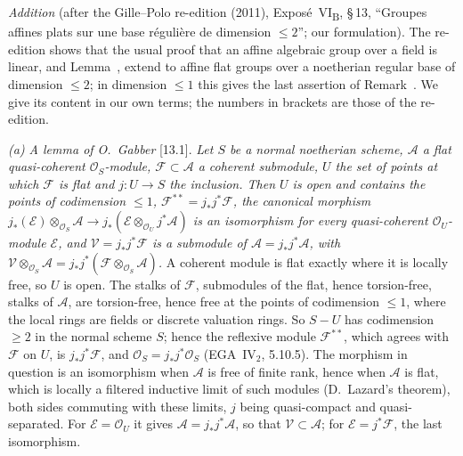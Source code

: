 
\par\bigskip\noindent{}\label{sec:sga3-VIB-13}%
\emph{Addition} (after the Gille--Polo re-edition (2011), Expos\'e~VI\textsubscript{B},
\S\,13, ``Groupes affines plats sur une base r\'eguli\`ere de dimension \(\leq2\)''; our
formulation). The re-edition shows that the usual proof that an affine algebraic group over a
field is linear, and Lemma~, extend to affine flat groups
over a noetherian regular base of dimension \(\leq2\); in dimension \(\leq1\) this gives the
last assertion of Remark~. We give its content in our
own terms; the numbers in brackets are those of the re-edition.

\par\smallskip\noindent\textit{(a) A lemma of O.~Gabber} [13.1]. \emph{Let \(S\) be a normal
noetherian scheme, \(\mathcal A\) a flat quasi-coherent \(\mathcal O_S\)-module,
\(\mathcal F\subset\mathcal A\) a coherent submodule, \(U\) the set of points at which
\(\mathcal F\) is flat and \(j:U\to S\) the inclusion. Then \(U\) is open and contains the
points of codimension \(\leq1\), \(\mathcal F^{**}=j_*j^*\mathcal F\), the canonical morphism
\(j_*(\mathcal E)\otimes_{\mathcal O_S}\mathcal A\to
j_*(\mathcal E\otimes_{\mathcal O_U}j^*\mathcal A)\) is an isomorphism for every
quasi-coherent \(\mathcal O_U\)-module \(\mathcal E\), and \(\mathcal V=j_*j^*\mathcal F\) is a
submodule of \(\mathcal A=j_*j^*\mathcal A\), with
\(\mathcal V\otimes_{\mathcal O_S}\mathcal A=j_*j^*(\mathcal F\otimes_{\mathcal O_S}\mathcal A)\).}
A coherent module is flat exactly where it is locally free, so \(U\) is open. The stalks of
\(\mathcal F\), submodules of the flat, hence torsion-free, stalks of \(\mathcal A\), are
torsion-free, hence free at the points of codimension \(\leq1\), where the local rings are
fields or discrete valuation rings. So \(S-U\) has codimension \(\geq2\) in the normal scheme
\(S\); hence the reflexive module \(\mathcal F^{**}\), which agrees with \(\mathcal F\) on
\(U\), is \(j_*j^*\mathcal F\), and \(\mathcal O_S=j_*j^*\mathcal O_S\)
(EGA~IV\(_2\), 5.10.5). The morphism in question is an isomorphism when \(\mathcal A\) is free
of finite rank, hence when \(\mathcal A\) is flat, which is locally a filtered inductive limit
of such modules (D.~Lazard's theorem), both sides commuting with these limits, \(j\) being
quasi-compact and quasi-separated. For \(\mathcal E=\mathcal O_U\) it gives
\(\mathcal A=j_*j^*\mathcal A\), so that \(\mathcal V\subset\mathcal A\); for
\(\mathcal E=j^*\mathcal F\), the last isomorphism.

